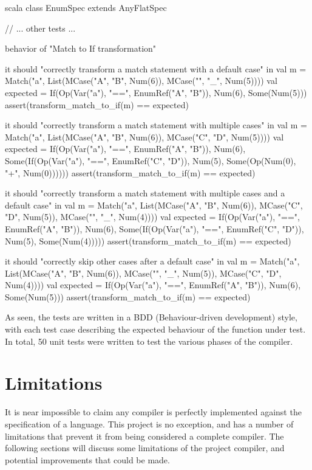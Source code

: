 \begin{code}{scala}
class EnumSpec extends AnyFlatSpec {
    // ... other tests ...

    behavior of "Match to If transformation"

    it should "correctly transform a match statement with a default case" in {
        val m = Match("a", List(MCase("A", "B", Num(6)), MCase("", "_", Num(5))))
        val expected = If(Op(Var("a"), "==", EnumRef("A", "B")), Num(6), Some(Num(5)))
        assert(transform_match_to_if(m) == expected)
    }

    it should "correctly transform a match statement with multiple cases" in {
        val m = Match("a", List(MCase("A", "B", Num(6)), MCase("C", "D", Num(5))))
        val expected = If(Op(Var("a"), "==", EnumRef("A", "B")), Num(6), Some(If(Op(Var("a"), "==", EnumRef("C", "D")), Num(5), Some(Op(Num(0), "+", Num(0))))))
        assert(transform_match_to_if(m) == expected)
    }

    it should "correctly transform a match statement with multiple cases and a default case" in {
        val m = Match("a", List(MCase("A", "B", Num(6)), MCase("C", "D", Num(5)), MCase("", "_", Num(4))))
        val expected = If(Op(Var("a"), "==", EnumRef("A", "B")), Num(6), Some(If(Op(Var("a"), "==", EnumRef("C", "D")), Num(5), Some(Num(4)))))
        assert(transform_match_to_if(m) == expected)
    }

    it should "correctly skip other cases after a default case" in {
        val m = Match("a", List(MCase("A", "B", Num(6)), MCase("", "_", Num(5)), MCase("C", "D", Num(4))))
        val expected = If(Op(Var("a"), "==", EnumRef("A", "B")), Num(6), Some(Num(5)))
        assert(transform_match_to_if(m) == expected)
    }
}
\end{code}

As seen, the tests are written in a BDD (Behaviour-driven development) style, with each test case
describing the expected behaviour of the function under test. In total, 50 unit tests were written
to test the various phases of the compiler.


\section{Limitations}

It is near impossible to claim any compiler is perfectly implemented against the specification of a
language. This project is no exception, and has a number of limitations that prevent it from being
considered a complete compiler. The following sections will discuss some limitations of the project
compiler, and potential improvements that could be made.

